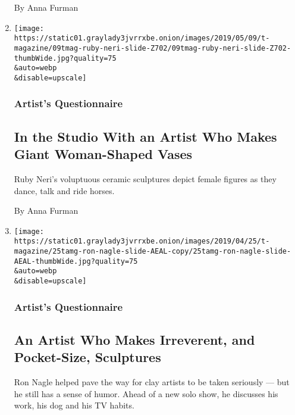\begin{enumerate}
  By Anna Furman
\item
  \href{/2019/05/09/t-magazine/ruby-neri.html}{}

  \texttt{[image: https://static01.graylady3jvrrxbe.onion/images/2019/05/09/t-magazine/09tmag-ruby-neri-slide-Z702/09tmag-ruby-neri-slide-Z702-thumbWide.jpg?quality=75\\\&auto=webp\\\&disable=upscale]}

  \hypertarget{artists-questionnaire-3}{%
  \subsubsection{Artist's Questionnaire}\label{artists-questionnaire-3}}

  \hypertarget{in-the-studio-with-an-artist-who-makes-giant-woman-shaped-vases}{%
  \subsection{In the Studio With an Artist Who Makes Giant Woman-Shaped
  Vases}\label{in-the-studio-with-an-artist-who-makes-giant-woman-shaped-vases}}

  Ruby Neri's voluptuous ceramic sculptures depict female figures as
  they dance, talk and ride horses.

  By Anna Furman
\item
  \href{/2019/04/29/t-magazine/ron-nagle.html}{}

  \texttt{[image: https://static01.graylady3jvrrxbe.onion/images/2019/04/25/t-magazine/25tamg-ron-nagle-slide-AEAL-copy/25tamg-ron-nagle-slide-AEAL-thumbWide.jpg?quality=75\\\&auto=webp\\\&disable=upscale]}

  \hypertarget{artists-questionnaire-4}{%
  \subsubsection{Artist's Questionnaire}\label{artists-questionnaire-4}}

  \hypertarget{an-artist-who-makes-irreverent-and-pocket-size-sculptures}{%
  \subsection{An Artist Who Makes Irreverent, and Pocket-Size,
  Sculptures}\label{an-artist-who-makes-irreverent-and-pocket-size-sculptures}}

  Ron Nagle helped pave the way for clay artists to be taken seriously
  --- but he still has a sense of humor. Ahead of a new solo show, he
  discusses his work, his dog and his TV habits.


\end{enumerate}
